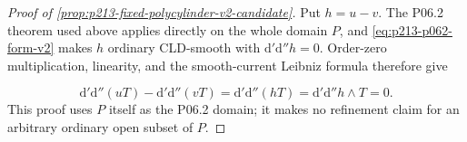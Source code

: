 \begin{proof}[Proof of
\cref{prop:p213-fixed-polycylinder-v2-candidate}]
Put \(h=u-v\). The P06.2 theorem used above applies directly on the whole
domain \(P\), and \eqref{eq:p213-p062-form-v2} makes \(h\) ordinary
CLD-smooth with \(\mathrm d'\mathrm d''h=0\). Order-zero multiplication,
linearity, and the smooth-current Leibniz formula therefore give

\[
 \mathrm d'\mathrm d''(uT)-\mathrm d'\mathrm d''(vT)
 =\mathrm d'\mathrm d''(hT)
 =\mathrm d'\mathrm d''h\wedge T=0.
\]
This proof uses \(P\) itself as the P06.2 domain; it makes no refinement
claim for an arbitrary ordinary open subset of \(P\).
\end{proof}
